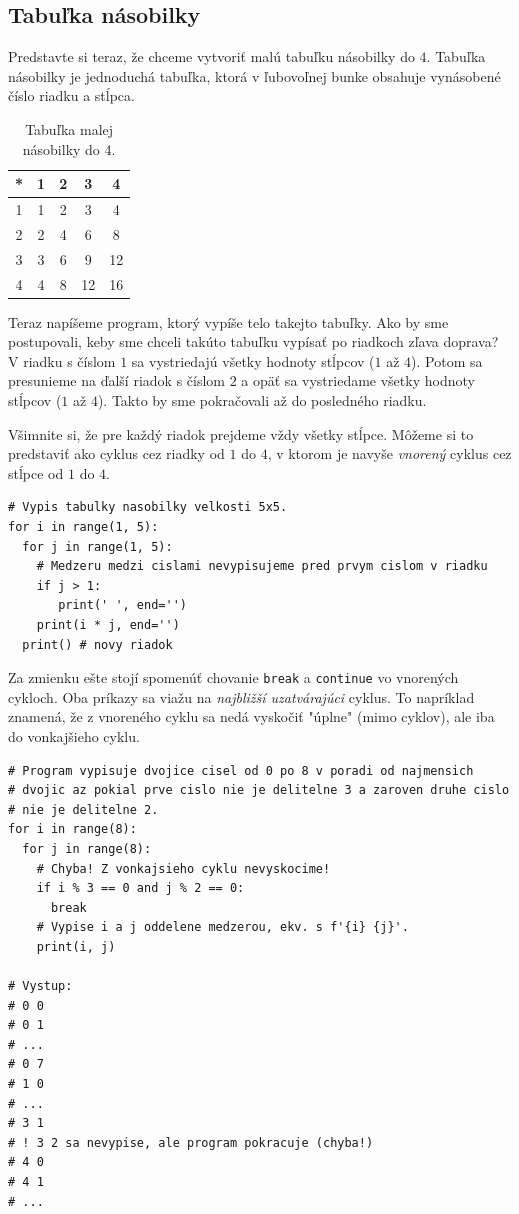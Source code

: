 \subsection{Tabuľka násobilky}
Predstavte si teraz, že chceme vytvoriť malú tabuľku násobilky do $4$. Tabuľka násobilky je jednoduchá tabuľka, ktorá v ľubovoľnej bunke obsahuje vynásobené číslo riadku a stĺpca.
\begin{table}[h]
\begin{center}
\renewcommand\arraystretch{1.3}
\setlength\doublerulesep{0pt}
\begin{tabular}{ c || c | c | c | c | }%
* & 1 & 2 & 3 & 4 \\
\hline\hline
1 & 1 & 2 & 3 & 4 \\ 
\hline
2 & 2 & 4 & 6 & 8 \\ 
\hline
3 & 3 & 6 & 9 & 12 \\ 
\hline
4 & 4 & 8 & 12 & 16 \\ 
\hline
\end{tabular}
\caption{Tabuľka malej násobilky do 4.}
\end{center}
\end{table}

Teraz napíšeme program, ktorý vypíše telo takejto tabuľky. Ako by sme postupovali, keby sme chceli takúto tabuľku vypísať po riadkoch zľava doprava? V riadku s číslom $1$ sa vystriedajú všetky hodnoty stĺpcov ($1$ až $4$). Potom sa presunieme na ďalší riadok s číslom $2$ a opäť sa vystriedame všetky hodnoty stĺpcov ($1$ až $4$). Takto by sme pokračovali až do posledného riadku.

Všimnite si, že pre každý riadok prejdeme vždy všetky stĺpce. Môžeme si to predstaviť ako cyklus cez riadky od $1$ do $4$, v ktorom je navyše \textit{vnorený} cyklus cez stĺpce od $1$ do $4$.
\begin{lstlisting}
# Vypis tabulky nasobilky velkosti 5x5.
for i in range(1, 5):
  for j in range(1, 5):
    # Medzeru medzi cislami nevypisujeme pred prvym cislom v riadku
    if j > 1:
       print(' ', end='')
    print(i * j, end='')
  print() # novy riadok
\end{lstlisting}

Za zmienku ešte stojí spomenúť chovanie \texttt{break} a \texttt{continue} vo vnorených cykloch. Oba príkazy sa viažu na \textit{najbližší uzatvárajúci} cyklus. To napríklad znamená, že z vnoreného cyklu sa nedá vyskočiť "úplne" (mimo cyklov), ale iba do vonkajšieho cyklu.
\begin{lstlisting}
# Program vypisuje dvojice cisel od 0 po 8 v poradi od najmensich
# dvojic az pokial prve cislo nie je delitelne 3 a zaroven druhe cislo
# nie je delitelne 2.
for i in range(8):
  for j in range(8):
    # Chyba! Z vonkajsieho cyklu nevyskocime!
    if i % 3 == 0 and j % 2 == 0:
      break
    # Vypise i a j oddelene medzerou, ekv. s f'{i} {j}'.
    print(i, j)

# Vystup:
# 0 0
# 0 1
# ...
# 0 7
# 1 0
# ...
# 3 1
# ! 3 2 sa nevypise, ale program pokracuje (chyba!)
# 4 0
# 4 1
# ...
\end{lstlisting}

